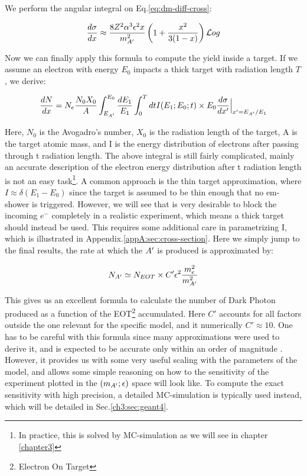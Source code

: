 We perform the angular integral on Eq.\ref{eq:dm-diff-cross}:

\begin{equation}
  \label{eq:dm-diff-cross-int}
  \frac{d\sigma}{dx} \approx \frac{8 Z^2 \alpha^3 \epsilon^2 x}{m^2_{A'}} \left( 1 + \frac{x^2}{3(1-x)} \right) \mathcal{L}og 
\end{equation}

Now we can finally apply this formula to compute the yield inside a target. If we assume an electron with energy $E_0$ impacts a thick target with radiation length $T$, we derive:

\begin{equation}
  \label{eq:dm-general-yield}
  \frac{dN}{dx} = N_e \frac{N_0 X_0}{A} \int_{E_{A'}}^{E_0} \frac{dE_1}{E_1} \int_0^T dt I(E_1;E_0;t) \times E_0 \frac{d\sigma}{dx'}\Big|_{x' = E_{A'}/E_1}
\end{equation}

Here, $N_0$ is the Avogadro's number, $X_0$ is the radiation length of the target, A is the target atomic mass, and I is the energy distribution of electrons after passing through t radiation length. The above integral is still fairly complicated, mainly an accurate description of the electron energy distribution after t radiation length is not an easy task\footnote{In practice, this is solved by MC-simulation as we will see in chapter \ref{chapter3}}. A common approach is the thin target approximation, where $I \approx \delta (E_1 - E_0)$ since the target is assumed to be thin enough that no em-shower is triggered. However, we will see that is very desirable to block the incoming $e^-$ completely in a realistic experiment, which means a thick target should instead be used. This requires some additional care in parametrizing I, which is illustrated in Appendix.\ref{appA:sec:cross-section}. Here we simply jump to the final results, the rate at which the $A'$ is produced is approximated by:

\begin{equation}
  \label{eq:dm-rate}
  N_{A'} \simeq N_{EOT} \times C' \epsilon^2 \frac{m_e^2}{m^2_{A'}}
\end{equation}

This gives us an excellent formula to calculate the number of Dark Photon produced as a function of the EOT\footnote{Electron On Target} accumulated. Here $C'$ accounts for all factors outside the one relevant for the specific model, and it numerically $C' \approx 10$. One has to be careful with this formula since many approximations were used to derive it, and is expected to be accurate only within an order of magnitude \cite{jdb}. However, it provides us with some very useful scaling with the parameters of the model, and allows some simple reasoning on how to the sensitivity of the experiment plotted in the $(m_{A'};\epsilon)$ space will look like. To compute the exact sensitivity with high precision, a detailed MC-simulation is typically used instead, which will be detailed in Sec.\ref{ch3:sec:geant4}.

